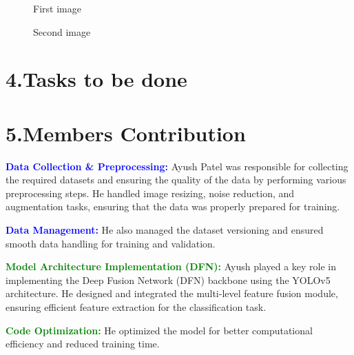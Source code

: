 \documentclass[12pt,a4paper]{article}
\newcommand{\colorsection}[1]{{\color{sectioncolor}\Large\bfseries#1}}
\begin{document}
\begin{figure}[H]
    \centering
    \begin{minipage}{0.45\textwidth}
        \centering
        \caption{First image}
    \end{minipage}
    \hspace{0.05\textwidth} %
    \begin{minipage}{0.45\textwidth}
        \centering
        \caption{Second image}
    \end{minipage}
\end{figure}
\section*{\colorsection{4.Tasks to be done}}
\section*{\colorsection{5.Members Contribution}}
\begin{tcolorbox}[colback=blue!5!white, colframe=blue!75!black, title=Ayush Patel (12240350)]
    \textcolor{blue}{\textbf{Data Collection \& Preprocessing:}} Ayush Patel was responsible for collecting the required datasets and ensuring the quality of the data by performing various preprocessing steps. He handled image resizing, noise reduction, and augmentation tasks, ensuring that the data was properly prepared for training.
    
    \vspace{0.2cm}
    
    \textcolor{blue}{\textbf{Data Management:}} He also managed the dataset versioning and ensured smooth data handling for training and validation.
\end{tcolorbox}

\vspace{0.5cm}

\begin{tcolorbox}[colback=green!5!white, colframe=green!75!black, title=Ayush Kumar Mishra (12240340)]
    \textcolor{green}{\textbf{Model Architecture Implementation (DFN):}} Ayush played a key role in implementing the Deep Fusion Network (DFN) backbone using the YOLOv5 architecture. He designed and integrated the multi-level feature fusion module, ensuring efficient feature extraction for the classification task.
    
    \vspace{0.2cm}
    
    \textcolor{green}{\textbf{Code Optimization:}} He optimized the model for better computational efficiency and reduced training time.
\end{tcolorbox}
\end{document}
